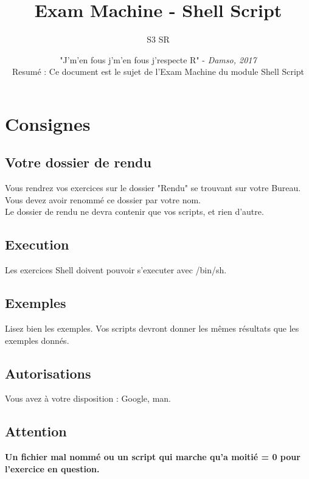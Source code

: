 \documentclass[12pt]{article}
\title{Exam Machine -  Shell Script}
\date{\vspace{2cm} "J'm'en fous j'm'en fous j'respecte R" - \emph{Damso, 2017}\\ \vspace{10cm} Resum\'e : Ce document est le sujet de l'Exam Machine du module Shell Script}
\author{S3 SR}
\begin{document}
    \maketitle
    \newpage
    \renewcommand\contentsname{}
    \tableofcontents

    \newpage
	\section{Consignes}

	\subsection{Votre dossier de rendu}
	 Vous rendrez vos exercices sur le dossier "Rendu" se trouvant sur votre Bureau.\\ Vous devez avoir renomm\'e ce dossier par votre nom. \\ 
	 Le dossier de rendu ne devra contenir que vos scripts, et rien d’autre.

	\subsection{Execution}
	 Les exercices Shell doivent pouvoir s'executer avec /bin/sh.

	\subsection{Exemples}
	 Lisez bien les exemples. Vos scripts devront donner les m\^emes r\'esultats que les exemples donn\'es.

	\subsection{Autorisations}
	Vous avez \`a votre disposition : Google, man.

	\subsection{Attention}
       	\textbf{Un fichier mal nomm\'e ou un script qui marche qu'a moiti\'e = 0 pour l'exercice en question.}
	\vspace{1cm}
\end{document}
